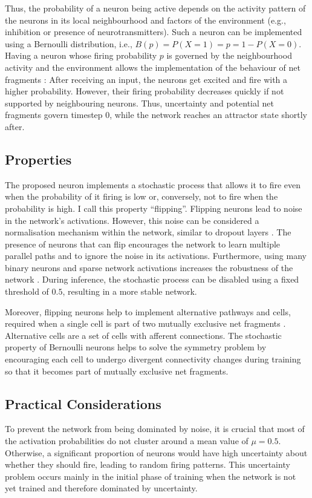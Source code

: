 Thus, the probability of a neuron being active depends on the activity pattern of the neurons in its local neighbourhood and factors of the environment (e.g., inhibition or presence of neurotransmitters).
Such a neuron can be implemented using a Bernoulli distribution, i.e., $B(p) = P(X = 1) = p = 1 - P(X=0)$. Having a neuron whose firing probability $p$ is governed by the neighbourhood activity and the environment allows the implementation of the behaviour of net fragments : After receiving an input, the neurons get excited and fire with a higher probability. However, their firing probability decreases quickly if not supported by neighbouring neurons. Thus, uncertainty and potential net fragments govern timestep 0, while the network reaches an attractor state shortly after. 

\subsection{Properties}
The proposed neuron implements a stochastic process that allows it to fire even when the probability of it firing is low or, conversely, not to fire when the probability is high.
I call this property ``flipping''.
Flipping neurons lead to noise in the network's activations.
However, this noise can be considered a normalisation mechanism within the network, similar to dropout layers .
The presence of neurons that can flip encourages the network to learn multiple parallel paths and to ignore the noise in its activations.
Furthermore, using many binary neurons and sparse network activations increases the robustness of the network .
During inference, the stochastic process can be disabled using a fixed threshold of $0.5$, resulting in a more stable network.

Moreover, flipping neurons help to implement alternative pathways and cells, required when a single cell is part of two mutually exclusive net fragments .
Alternative cells are a set of cells with afferent connections. The stochastic property of Bernoulli neurons helps to solve the symmetry problem by encouraging each cell to undergo divergent connectivity changes during training so that it becomes part of mutually exclusive net fragments.

\subsection{Practical Considerations}
To prevent the network from being dominated by noise, it is crucial that most of the activation probabilities do not cluster around a mean value of $\mu = 0.5$. Otherwise, a significant proportion of neurons would have high uncertainty about whether they should fire, leading to random firing patterns. This uncertainty problem occurs mainly in the initial phase of training when the network is not yet trained and therefore dominated by uncertainty.

